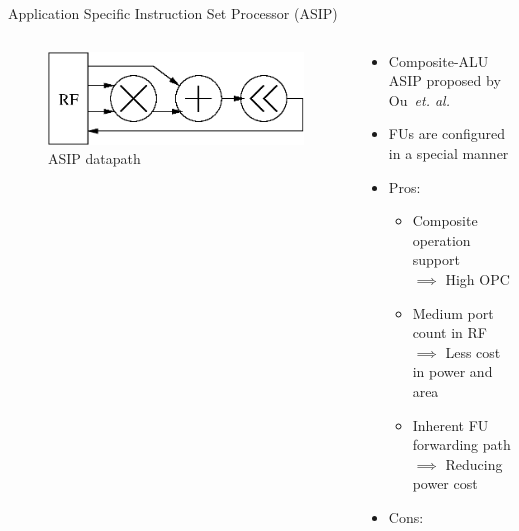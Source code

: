 \documentclass{beamer}
\begin{document}
\begin{CJK}{UTF8}{bkai}
            \begin{frame}{Application Specific Instruction Set Processor (ASIP)}
                \begin{columns}
                    \begin{column}{0.45\textwidth}
                        \begin{figure}[!ht]
                            \centering
                            \includegraphics[width=0.9\linewidth]{./figs/cascade.eps}
                            \caption{ASIP datapath}
                        \end{figure}
                    \end{column}
                    \begin{column}{0.6\textwidth}
                        \vspace{-0.5em}
                        \begin{itemize}
                            \item <2-> {Composite-ALU ASIP proposed by Ou~\textit{et. al.}\footnotemark}
                            \item <3-> {FUs are configured in a special manner}
                            \item <4-> {Pros:
                                \begin{itemize}
                                    \item Composite operation support \\ $\implies$ High OPC
                                    \item Medium port count in RF \\ $\implies$ Less cost in power and area
                                    \item Inherent FU forwarding path \\ $\implies$ Reducing power cost
                                \end{itemize}
                                }
                            \item <5-> {Cons:
                                \begin{itemize}

\end{itemize}}
\end{itemize}
\end{column}
\end{columns}
\end{frame}
\end{CJK}
\end{document}
